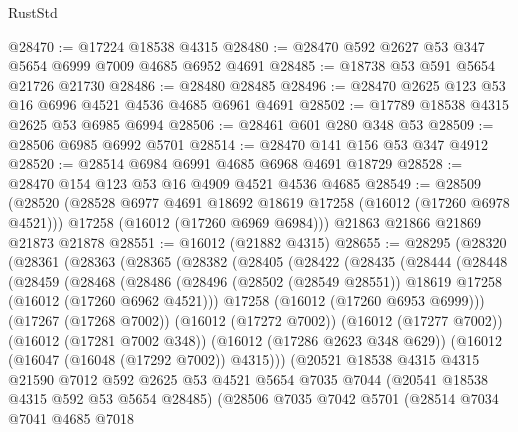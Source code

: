 \begin{lexlean}{RustStd}
\begin{coremodule}
@28470 := @17224 @18538 @4315
@28480 := @28470 @592 @2627 @53 @347 @5654 @6999 @7009 @4685 @6952 @4691
@28485 := @18738 @53 @591 @5654 @21726 @21730
@28486 := @28480 @28485
@28496 := @28470 @2625 @123 @53 @16 @6996 @4521 @4536 @4685 @6961 @4691
@28502 := @17789 @18538 @4315 @2625 @53 @6985 @6994
@28506 := @28461 @601 @280 @348 @53
@28509 := @28506 @6985 @6992 @5701
@28514 := @28470 @141 @156 @53 @347 @4912
@28520 := @28514 @6984 @6991 @4685 @6968 @4691 @18729
@28528 := @28470 @154 @123 @53 @16 @4909 @4521 @4536 @4685
@28549 := @28509
    (@28520
      (@28528 @6977 @4691 @18692 @18619 @17258 (@16012 (@17260 @6978 @4521)))
      @17258
      (@16012 (@17260 @6969 @6984)))
    @21863
    @21866
    @21869
    @21873
    @21878
@28551 := @16012 (@21882 @4315)
@28655 := @28295
    (@28320
      (@28361
        (@28363
          (@28365
            (@28382
              (@28405
                (@28422
                  (@28435
                    (@28444
                      (@28448
                        (@28459
                          (@28468
                            (@28486
                              (@28496
                                (@28502 (@28549 @28551))
                                @18619
                                @17258
                                (@16012 (@17260 @6962 @4521)))
                              @17258
                              (@16012 (@17260 @6953 @6999)))
                            (@17267 (@17268 @7002))
                            (@16012 (@17272 @7002))
                            (@16012 (@17277 @7002))
                            (@16012 (@17281 @7002 @348))
                            (@16012 (@17286 @2623 @348 @629))
                            (@16012 (@16047 (@16048 (@17292 @7002)) @4315)))
                          (@20521
                            @18538
                            @4315
                            @4315
                            @21590
                            @7012
                            @592
                            @2625
                            @53
                            @4521
                            @5654
                            @7035
                            @7044
                            (@20541 @18538 @4315 @592 @53 @5654 @28485)
                            (@28506
                              @7035
                              @7042
                              @5701
                              (@28514
                                @7034
                                @7041
                                @4685
                                @7018

\end{coremodule}
\end{lexlean}
